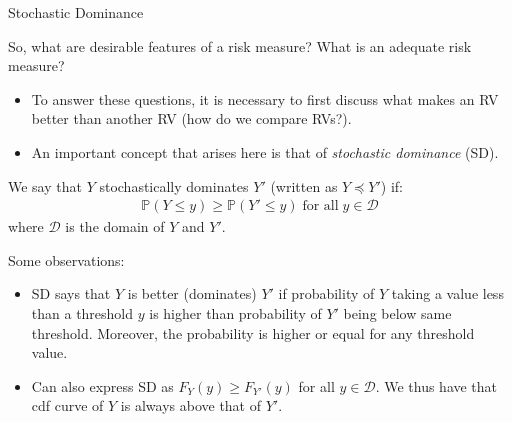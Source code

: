 \documentclass[9pt]{beamer}
\begin{document}
%
\begin{frame}{Stochastic Dominance}
\begin{block}{}
So, what are desirable features of a risk measure? What is an adequate risk measure?
\end{block}
\begin{itemize}
\item To answer these questions, it is necessary to first discuss what makes an RV better than another RV (how do we compare RVs?). 

\item An important concept that arises here is that of {\em stochastic dominance} (SD).

\end{itemize}

\begin{block}{}
We say that $Y$ stochastically dominates $Y'$ (written as $Y\preceq Y'$) if:
\begin{align*}
\mathbb{P}(Y\leq y)\geq \mathbb{P}(Y'\leq y)\; \textrm{for all}\;  y\in \mathcal{D}
\end{align*}
where $\mathcal{D}$ is the domain of $Y$ and $Y'$. 
\end{block}
Some observations:
\begin{itemize}
   \setlength{\itemsep}{10pt}
\item SD says that $Y$ is better (dominates) $Y'$ if probability of $Y$ taking a value less than a threshold $y$ is higher than probability of $Y'$ being below same threshold. Moreover, the probability is higher or equal for any threshold value. 
\item Can also express SD as $F_{Y}(y)\geq F_{Y'}(y)$ for all $y\in\mathcal{D}$. We thus have that cdf curve of $Y$ is always above that of $Y'$. 

\end{itemize}


\end{frame}
\end{document}
